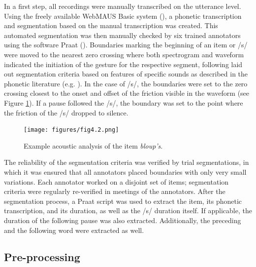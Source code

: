 In a first step, all recordings were manually transcribed on the utterance level. Using the freely available WebMAUS Basic system (\cite{Schiel1999, Kisler2017}), a phonetic transcription and segmentation based on the manual transcription was created. This automated segmentation was then manually checked by six trained annotators using the software Praat (\cite{Boersma2019}). Boundaries marking the beginning of an item or /s/ were moved to the nearest zero crossing where both spectrogram and waveform indicated the initiation of the gesture for the respective segment, following laid out segmentation criteria based on features of specific sounds as described in the phonetic literature (e.g. \cite{Ladefoged2003}). In the case of /s/, the boundaries were set to the zero crossing closest to the onset and offset of the friction visible in the waveform (see Figure \ref{fig:4_2}). If a pause followed the /s/, the boundary was set to the point where the friction of the /s/ dropped to silence. 

\begin{figure}
    \centering
    \texttt{[image: figures/fig4.2.png]}
    \caption{Example acoustic analysis of the item \textit{bloup’s}.}
    \label{fig:4_2}
\end{figure}

The reliability of the segmentation criteria was verified by trial segmentations, in which it was ensured that all annotators placed boundaries with only very small variations. Each annotator worked on a disjoint set of items; segmentation criteria were regularly re-verified in meetings of the annotators. After the segmentation process, a Praat script was used to extract the item, its phonetic transcription, and its duration, as well as the /s/ duration itself. If applicable, the duration of the following pause was also extracted. Additionally, the preceding and the following word were extracted as well.

\subsection{Pre-processing}\label{section04_1_5}

